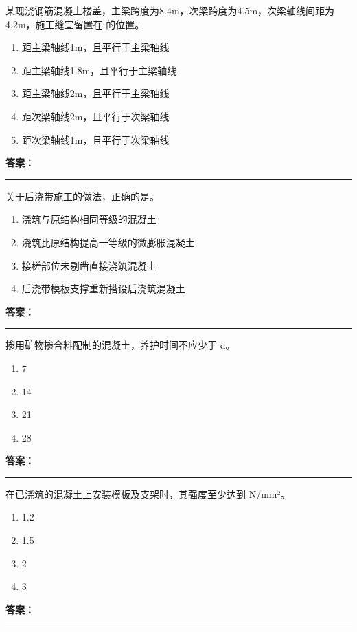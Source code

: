 \documentclass[UTF8,fontset=fandol,11pt]{ctexart}
\newcommand{\answerline}{\textcolor{answerred}{\rule{2.4cm}{0.7pt}}}
\begin{document}
\begin{quizbox}[title={第 77 题}]
某现浇钢筋混凝土楼盖，主梁跨度为8.4m，次梁跨度为4.5m，次梁轴线间距为4.2m，施工缝宜留置在 的位置。\\
\begin{enumerate}[label=\Alph*.]
\item 距主梁轴线1m，且平行于主梁轴线
\item 距主梁轴线1.8m，且平行于主梁轴线
\item 距主梁轴线2m，且平行于主梁轴线
\item 距次梁轴线2m，且平行于次梁轴线
\item 距次梁轴线1m，且平行于次梁轴线
\end{enumerate}
\textbf{\textcolor{answerred}{答案：}} \answerline
\end{quizbox}

\begin{quizbox}[title={第 78 题}]
关于后浇带施工的做法，正确的是。\\
\begin{enumerate}[label=\Alph*.]
\item 浇筑与原结构相同等级的混凝土
\item 浇筑比原结构提高一等级的微膨胀混凝土
\item 接槎部位未剔凿直接浇筑混凝土
\item 后浇带模板支撑重新搭设后浇筑混凝土
\end{enumerate}
\textbf{\textcolor{answerred}{答案：}} \answerline
\end{quizbox}

\begin{quizbox}[title={第 79 题}]
掺用矿物掺合料配制的混凝土，养护时间不应少于 d。\\
\begin{enumerate}[label=\Alph*.]
\item 7
\item 14
\item 21
\item 28
\end{enumerate}
\textbf{\textcolor{answerred}{答案：}} \answerline
\end{quizbox}

\begin{quizbox}[title={第 80 题}]
在已浇筑的混凝土上安装模板及支架时，其强度至少达到 N/mm²。\\
\begin{enumerate}[label=\Alph*.]
\item 1.2
\item 1.5
\item 2
\item 3
\end{enumerate}
\textbf{\textcolor{answerred}{答案：}} \answerline
\end{quizbox}
\end{document}
